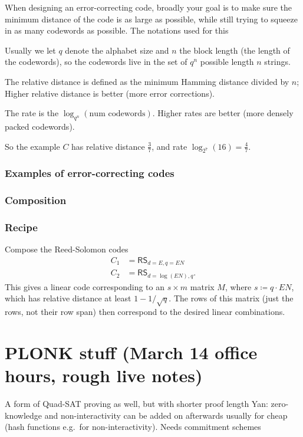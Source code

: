 \documentclass[11pt]{scrreprt}
\begin{document}
When designing an error-correcting code, broadly your goal is to make sure the
minimum distance of the code is as large as possible,
while still trying to squeeze in as many codewords as possible.
The notations used for this
\begin{itemize}
  \ii Usually we let $q$ denote the alphabet size and $n$ the block length
  (the length of the codewords),
  so the codewords live in the set of $q^n$ possible length $n$ strings.

  \ii The \alert{relative distance} is defined as the minimum Hamming distance divided by $n$;
  Higher relative distance is better (more error corrections).

  \ii The \alert{rate} is the $\log_{q^n}(\text{num codewords})$.
  Higher rates are better (more densely packed codewords).
\end{itemize}
So the example $C$ has relative distance $\frac 37$,
and rate $\log_{2^7}(16) = \frac 47$.

\subsection{Examples of error-correcting codes}

\subsection{Composition}

\subsection{Recipe}
Compose the Reed-Solomon codes
\begin{align*}
  C_1 &= \mathsf{RS}_{d=E,q=EN} \\
  C_2 &= \mathsf{RS}_{d=\log(EN),q}.
\end{align*}
This gives a linear code corresponding to an $s \times m$ matrix $M$,
where $s \coloneqq q \cdot EN$, which has relative distance at least $1 - 1/\sqrt q$.
The rows of this matrix (just the rows, not their row span)
then correspond to the desired linear combinations.

\appendix

\chapter{PLONK stuff (March 14 office hours, rough live notes)}
\begin{itemize}
  \ii A form of Quad-SAT proving as well, but with shorter proof length
  \ii Yan: zero-knowledge and non-interactivity can be added on afterwards
  usually for cheap
  (hash functions e.g.\ for non-interactivity).
  \ii Needs commitment schemes
\end{itemize}
\end{document}
